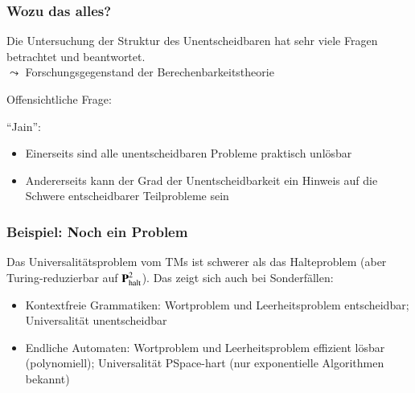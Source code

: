 \documentclass[aspectratio=1610,onlymath]{beamer}
\begin{document}
\begin{frame}\frametitle{Wozu das alles?}

Die Untersuchung der Struktur des Unentscheidbaren hat
sehr viele Fragen betrachtet und beantwortet.\\
$\leadsto$ Forschungsgegenstand der \alert{Berechenbarkeitstheorie}
\bigskip\pause

Offensichtliche Frage: 
\bigskip\pause

"`Jain"':
\begin{itemize}
\item Einerseits sind alle unentscheidbaren Probleme praktisch unlösbar
\item Andererseits kann der Grad der Unentscheidbarkeit ein Hinweis auf die Schwere
entscheidbarer Teilprobleme sein
\end{itemize}

\end{frame}

\begin{frame}\frametitle{Beispiel: Noch ein Problem}


\pause Das Universalitätsproblem vom TMs ist schwerer als das Halteproblem (aber Turing-reduzierbar auf $\textbf{\textcolor{black}{P}}^2_{\text{halt}}$). Das zeigt sich auch bei Sonderfällen:
\begin{itemize}
\item \alert{Kontextfreie Grammatiken:} Wortproblem und Leerheitsproblem entscheidbar; Universalität unentscheidbar
\item \alert{Endliche Automaten:} Wortproblem und Leerheitsproblem effizient lösbar (polynomiell); Universalität PSpace-hart (nur exponentielle Algorithmen bekannt)
\end{itemize}

\end{frame}

\end{document}
